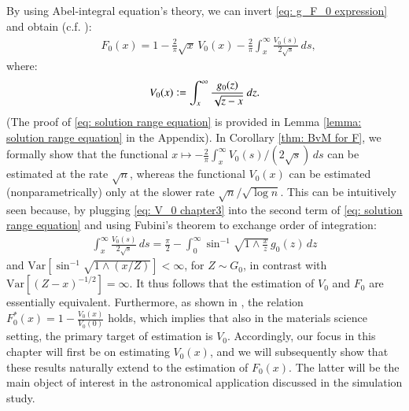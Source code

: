 By using Abel-integral equation's theory, we can invert \eqref{eq: g_F_0 expression} and obtain (c.f. \cite{19}):
\begin{align}\label{eq: solution range equation}
  &F_0(x) = 1 -\frac{2}{\pi} \sqrt{x} \, V_0(x) - \frac{2}{\pi} \int_{x}^{\infty} \frac{V_0(s)}{2 \sqrt{s}} \, ds,  
\end{align}
where:
\begin{align}\label{eq: V_0 chapter3}
    V_0(x) \vcentcolon=\int_x^{\infty} \frac{g_0(z)}{\sqrt{z-x}} \: d z.
\end{align}
(The proof of \eqref{eq: solution range equation} is provided in Lemma \ref{lemma: solution range equation} in the Appendix). In Corollary \ref{thm: BvM for F}, we formally show that the functional $x \mapsto - \frac{2}{\pi} \int_{x}^{\infty} V_0(s) / (2 \sqrt{s}) \, ds$ can be estimated at the rate $\sqrt{n}$, whereas the functional $V_0(x)$ can be estimated (nonparametrically) only at the slower rate $\sqrt{n}/\sqrt{\log{n}}$. This can be intuitively seen because, by plugging \eqref{eq: V_0 chapter3} into the second term of \eqref{eq: solution range equation} and using Fubini's theorem to exchange order of integration:
\begin{align}\label{eq: second equation range}
\int_{x}^{\infty} \frac{V_0(s)}{2 \sqrt{s}} \, ds =\frac{\pi}{2}-\int_0^{\infty} \sin ^{-1} \sqrt{1 \wedge \frac{x}{z}} \,  g_0(z)\, dz 
\end{align}
and $\mathrm{Var}[\sin ^{-1} \sqrt{1 \wedge\left(x / Z\right)}] < \infty$, for $Z \sim G_0$, in contrast with $\mathrm{Var}[(Z-x)^{-1/2}] = \infty$. It thus follows that the estimation of $V_0$ and $F_0$ are essentially equivalent. Furthermore, as shown in \cite{1}, the relation
$ 
F_0^*(x) = 1 - \frac{V_0(x)}{V_0(0)}
$ 
holds, which implies that also in the materials science setting, the primary target of estimation is $V_0$. Accordingly, our focus in this chapter will first be on estimating $V_0(x)$, and we will subsequently show that these results naturally extend to the estimation of $F_0(x)$. The latter will be the main object of interest in the astronomical application discussed in the simulation study.

